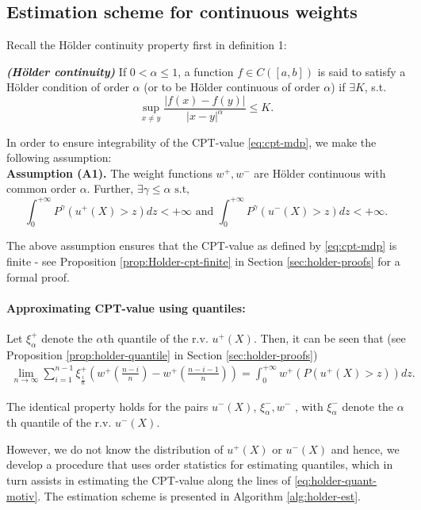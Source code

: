 \subsection{Estimation scheme for \holder continuous weights}
Recall the H\"{o}lder continuity property first in definition 1:
\begin{definition}
{\textbf{\textit{(H\"{o}lder continuity)}}}
If $0 < \alpha \leq 1$, a function $f \in C([a,b])$ is said to satisfy
a H\"{o}lder condition of order $\alpha$ (or to be H\"{o}lder continuous
of order $\alpha$) if $\exists K$, s.t.
\[
\sup_{x \neq y} \frac{| f(x) - f(y) |}{| x-y |^{\alpha}} \leq K .
\]
\end{definition}

In order to ensure integrability of the CPT-value \eqref{eq:cpt-mdp}, we make the following assumption:\\[1ex]
\textbf{Assumption (A1).}  
The weight functions $w^+, w^-$ are H\"{o}lder continuous with common order $\alpha$. Further,
$\exists \gamma \le \alpha \text{   s.t,  }$ 
$$\int_0^{+\infty} P^{\gamma} (u^+(X)>z) dz < +\infty \text{ and }\int_0^{+\infty} P^{\gamma} (u^-(X)>z) dz < +\infty.$$

The above assumption ensures that the CPT-value as defined by \eqref{eq:cpt-mdp} is finite - see Proposition \ref{prop:Holder-cpt-finite} in Section \ref{sec:holder-proofs} for a formal proof.


\paragraph{Approximating CPT-value using quantiles:}
Let $\xi^+_{\alpha}$ denote the $\alpha$th quantile of the r.v. $u^+(X)$. Then, it can be seen that (see Proposition \ref{prop:holder-quantile} in Section \ref{sec:holder-proofs})
\begin{align}
\label{eq:holder-quant-motiv}
\lim_{n \rightarrow \infty} \sum_{i=1}^{n-1} \xi^+_{\frac{i}{n}} \left(w^+\left(\frac{n-i}{n}\right)- w^+\left(\frac{n-i-1}{n}\right) \right) = \int_0^{+\infty} w^+(P(u^+(X)>z)) dz.
\end{align}

The identical property holds for the pairs $u^-(X)$, $\xi^-_{\alpha}, w^-$ , with $\xi^-_{\alpha}$ denote the 
$\alpha$th quantile of the r.v. $u^-(X)$.

However, we do not know the distribution of $u^+(X)$ or $u^-(X)$ and hence, we develop a procedure that uses order statistics for estimating quantiles, which in turn assists in estimating the CPT-value along the lines of \eqref{eq:holder-quant-motiv}. The estimation scheme is presented in Algorithm \ref{alg:holder-est}.




